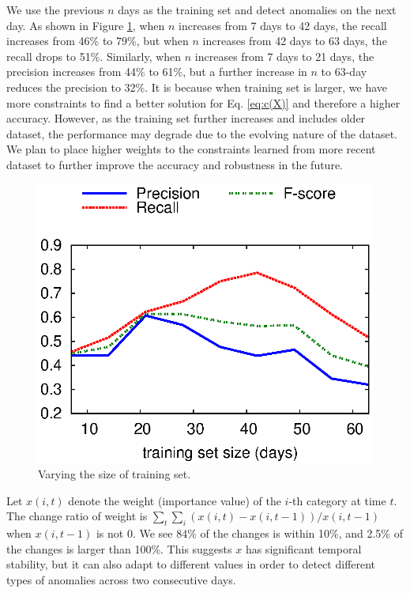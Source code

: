  We use the previous $n$ 
days as the training set and detect anomalies on the next day. As
shown in Figure
\ref{fig:multi-train-test}, when $n$ increases from 7 days to 42 days, 
the recall increases from 46\% 
to 79\%, but when $n$ increases from 42 days to 63 days, the recall drops 
to 51\%. Similarly, when $n$ increases from 7 days to 21 days, the 
precision increases from 44\% to 61\%, but a further increase in $n$ to 
63-day reduces the precision to 32\%. It is because when training set is larger, 
we have more constraints to find a better solution for Eq. \ref{eq:c(X)} and
therefore a higher accuracy. However, as the training set further
increases and includes older dataset, the performance may degrade due to the
evolving nature of the dataset. We plan to place higher weights to the
constraints learned from more recent dataset to further improve the
accuracy and robustness in the future.


\begin{figure}
\centering
\includegraphics[width=\figurewidthA]{Figs/multi-train-test.ps}
\caption{Varying the size of training set.}
\label{fig:multi-train-test}
\end{figure}


 Let $x(i, t)$ denote the 
weight (importance value) of the $i$-th category at time $t$. The change 
ratio of weight is $\sum_{t} \sum_{i} (x(i, t) - x(i, t-1))/x(i, t-1)$ when 
$x(i, t-1)$ is not $0$. %
We see 84\% of the changes is
within 10\%, and 2.5\% of the changes is larger than 100\%. This
suggests $x$ has significant temporal stability, but it can also
adapt to different values in order to detect different types of
anomalies across two consecutive days.

